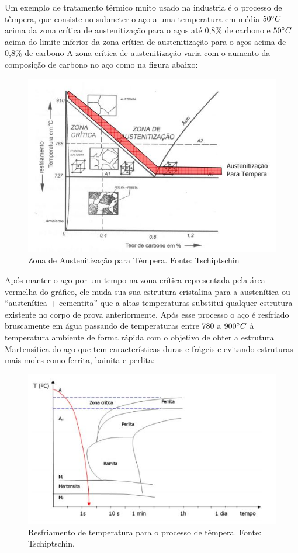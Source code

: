 Um exemplo de tratamento térmico muito usado na industria é o processo de têmpera, que consiste no submeter o aço a uma temperatura em média $50 \degree C$ acima da zona crítica de austenitização para o aços até 0,8\% de carbono e $50 \degree C$ acima do limite inferior da zona crítica de austenitização para o aços acima de 0,8\% de carbono A zona crítica de austenitização varia com o aumento da composição de carbono no aço como na figura abaixo:
\begin{figure}[!ht]
	\centering
	\label{austenitizacao}
	\includegraphics[keepaspectratio=true,scale=0.8]{figuras/austenitizacao.JPG}
	\caption{Zona de Austenitização para Têmpera. Fonte: Tschiptschin}
\end{figure}

Após manter o aço por um tempo  na zona crítica representada pela área vermelha do gráfico, ele muda sua sua estrutura cristalina para a austenítica ou “austenítica + cementita” que a altas temperaturas substituí qualquer estrutura existente no corpo de prova anteriormente. Após esse processo o aço é resfriado bruscamente em água passando de temperaturas entre 780 a $900 \degree C$ à temperatura ambiente de forma rápida com o objetivo de obter a estrutura Martensítica do aço que tem características duras e frágeis e evitando estruturas mais moles como ferrita, bainita e perlita:
\begin{figure}[!ht]
	\centering
	\label{resfriamento1}
	\includegraphics[keepaspectratio=true,scale=0.8]{figuras/resfriamento1.JPG}
	\caption{Resfriamento de temperatura para o processo de têmpera. Fonte: Tschiptschin.}
\end{figure}

